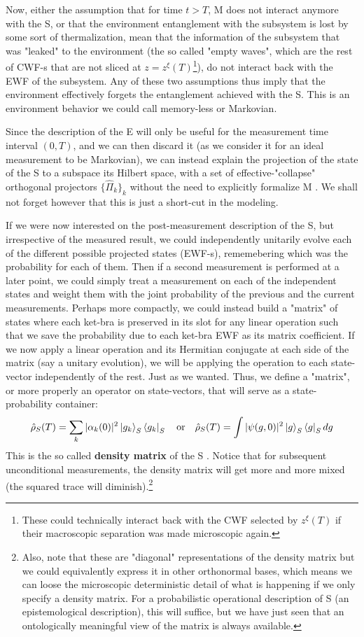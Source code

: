 \documentclass[11pt, a4paper]{article} %
\begin{document}
Now, either the assumption that for time $t>T$, M does not interact anymore with the S, or that the environment entanglement with the subsystem is lost by some sort of thermalization, mean that the information of the subsystem that was "leaked" to the environment (the so called "empty waves", which are the rest of CWF-s that are not sliced at $z=z^\xi(T)$\footnote{These could technically interact back with the CWF selected by $z^\xi(T)$ if their macroscopic separation was made microscopic again.}), do not interact back with the EWF of the subsystem. Any of these two assumptions thus imply that the environment effectively forgets the entanglement achieved with the S. This is an environment behavior we could call memory-less or Markovian.

Since the description of the E will only be useful for the measurement time interval $(0,T)$, and we can then discard it (as we consider it for an ideal measurement to be Markovian), we can instead explain the projection of the state of the S to a subspace its Hilbert space, with a set of effective-"collapse" orthogonal projectors $\{\hat{\Pi}_k\}_k$ without the need to explicitly formalize M \cite{Durr}. We shall not forget however that this is just a short-cut in the modeling.

If we were now interested on the post-measurement description of the S, but irrespective of the measured result, we could independently unitarily evolve each of the different possible projected states (EWF-s), rememebering which was the probability for each of them. Then if a second measurement is performed at a later point, we could simply treat a measurement on each of the independent states and weight them with the joint probability of the previous and the current measurements. Perhaps more compactly, we could instead build a "matrix" of states where each ket-bra is preserved in its slot for any linear operation such that we save the probability due to each ket-bra EWF as its matrix coefficient. If we now apply a linear operation and its Hermitian conjugate at each side of the matrix (say a unitary evolution), we will be applying the operation to each state-vector independently of the rest. Just as we wanted. Thus, we define a "matrix", or more properly an operator on state-vectors, that will serve as a state-probability container:
\begin{equation}\label{dens}
\hat{\rho}_S(T) =\sum_k |\alpha_k(0)|^2\ket{g_k}_S\bra{g_k}_S \quad \text{or} \quad \hat{\rho}_S(T)=\int |\psi(g,0)|^2\ket{g}_S\bra{g}_S dg
\end{equation}
This is the so called {\bf density matrix} of the S \cite{vonNeumann, Durr, Holland}. Notice that for subsequent unconditional measurements, the density matrix will get more and more mixed (the squared trace will diminish).\footnote{Also, note that these are "diagonal" representations of the density matrix but we could equivalently express it in other orthonormal bases, which means we can loose the microscopic deterministic detail of what is happening if we only specify a density matrix. For a probabilistic operational description of S (an epistemological description), this will suffice, but we have just seen that an ontologically meaningful view of the matrix is always available.}
\end{document}
